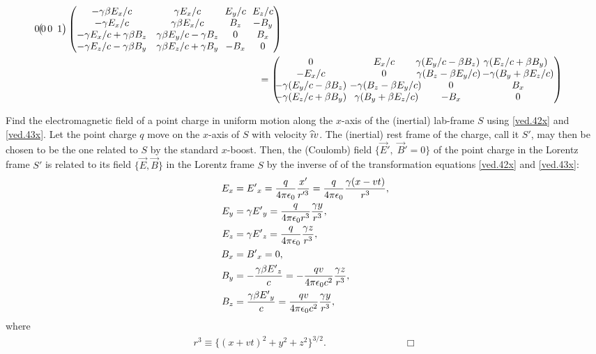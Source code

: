 \begin{scriptsize}
\begin{align*}
\begin{pmatrix}
\nnt\nnnt 0 &\nnt\nnnt 0 &\nnt\nnnt 0 &\nnnt 1
\end{pmatrix}
\begin{pmatrix}
-\gamma\gkb E_x/c&\gamma E_x/c & \nnt E_y/c &\nnt E_ z/c\\
-\gamma E_x/c &\gamma\gkb E_x/c & \nnt B_z &\nnt - B_y\\
-\gamma E_x/c+\gamma\gkb B_z &\gamma\gkb 
E_y/c- \gamma B_z &\nnt 0 &\nnt B_x\\
-\gamma E_z/c-\gamma\gkb B_y &\gamma\gkb 
E_z/c +\gamma B_y &\nnt -B_x &\nnt 0
\end{pmatrix} \\
&\hspace{-24pt} 
=\begin{pmatrix}
\nnnt 0&\nnnt\nnnt E_x/c &\nt\nnnt\nnnt\nnnt\gamma 
(E_y/c -\gkb B_z)&\nnnt\nnt\nnnt \gamma(E_z/c +\gkb B_y)\\
\nnnt -E_x/c &\nnnt\nnnt 0 &\nt\nnnt\nnt\nnnt 
\gamma(B_z-\gkb 
E_y/c) &\nnt\nnnt -\gamma (B_y+\gkb E_z/c) \\ 
\nnnt -\gamma (E_y/c -\gkb B_z)&\nt\nnnt -\gamma 
(B_z -\gkb E_y/c) &\nnnt \nnnt  0&\nnt\nnnt B_x\\
\nnnt-\gamma(E_z/c+\gkb B_y) & \nnnt \gamma 
(B_y+\gkb E_z/c) & \nnnt\nnnt   -B_x&\nnt\nnnt  0 
\end{pmatrix}
\end{align*}
\end{scriptsize}\ebxns

\exm Find the electromagnetic field of a point  charge in 
uniform motion along the $x$-axis of the (inertial) 
lab-frame $S$  using \eqref{ved.42x} and \eqref{ved.43x}. 
\soln Let the point charge $q$ move on the $x$-axis of $S$ 
with velocity ${\widehat{\imath}} v$. The (inertial) rest frame of the 
charge, call it $S'$, may then be chosen to be the one 
related to $S$ by the standard $ x $-boost. Then, the 
(Coulomb) field $\{\vec{E}',\;\vec{B}'=0\}$ of the point 
charge  in the Lorentz frame $S'$ is related to its field 
$\{\vec{E},\vec{B}\}$ in the Lorentz frame $S$ by the 
inverse 
of of the transformation equations \eqref{ved.42x} and 
\eqref{ved.43x}:
\begin{align*}
E_x& ={E'}_x=\frac{q}{4\pi \epsilon_0}\frac{x'}{r'^3}
=\frac{q} {4\pi 
\epsilon_0}\frac{\gamma(x-vt)}{r^3},\\
E_y& =\gamma {\ensuremath{E'}}_y = \frac{q}{4\pi\epsilon_0 r^3}
\frac{\gamma y}{r^3}, \\
E_z &=\gamma {\ensuremath{E'}}_z = \frac{q}{4\pi\epsilon_0}
\frac{\gamma z}{ r^3}, \\
B_x& ={B'}_x =0,\\
B_y& =- 
\frac{{\gamma}{\beta} {E'}_z}{c}=-\frac{qv}{4\pi\epsilon_0 c^2}
\frac{\gamma z}{ r^3}, \\
B_z& =\frac{{\gamma}{\beta} {E'}_y }{c}=\frac{qv}{4\pi\epsilon_0 c^2}
\frac{\gamma y}{ r^3} ,
\end{align*}
where
\begin{align*}
r^3\equiv \{(x+vt)^2+y^2+z^2\}^{3/2}.\hspace{96pt}\Box
\end{align*}



